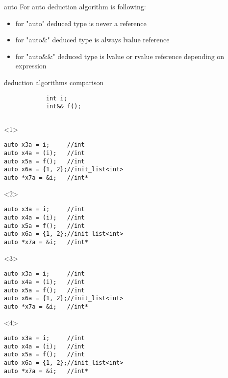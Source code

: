 \documentclass[10pt]{beamer}
\begin{document}
\begin{frame}[fragile]{auto}
	For \alert{auto} deduction algorithm is following:
	\begin{itemize}[<+- |alert@+>]
		\item for \alert{"auto"} deduced type is never a reference
		\item for \alert{"auto\&"} deduced type is always lvalue reference
		\item for \alert{"auto\&\&"} deduced type is lvalue or rvalue reference depending on expression
	\end{itemize}
\end{frame}

\begin{frame}[fragile]{deduction algorithms comparison}
\centering
	\begin{verbatim}
			int i;
			int&& f();
	\end{verbatim}
	\vfill
	\begin{columns}
	\begin{column}{0.48\linewidth}
	\begin{onlyenv}
		\begin{verbatim}
auto x3a = i;     //int
auto x4a = (i);   //int
auto x5a = f();   //int
auto x6a = {1, 2};//init_list<int>
auto *x7a = &i;   //int*
		\end{verbatim}
	\end{onlyenv}
	\begin{onlyenv}
		\begin{verbatim}
auto x3a = i;     //int
auto x4a = (i);   //int
auto x5a = f();   //int
auto x6a = {1, 2};//init_list<int>
auto *x7a = &i;   //int*
		\end{verbatim}
	\end{onlyenv}
	\begin{onlyenv}
		\begin{verbatim}
auto x3a = i;     //int
auto x4a = (i);   //int
auto x5a = f();   //int
auto x6a = {1, 2};//init_list<int>
auto *x7a = &i;   //int*
		\end{verbatim}
	\end{onlyenv}
	\begin{onlyenv}
		\begin{verbatim}
auto x3a = i;     //int
auto x4a = (i);   //int
auto x5a = f();   //int
auto x6a = {1, 2};//init_list<int>
auto *x7a = &i;   //int*

\end{verbatim}
\end{onlyenv}
\end{column}
\end{columns}
\end{frame}
\end{document}
